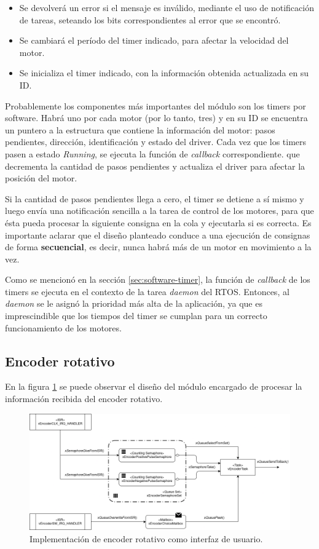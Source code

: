\documentclass{IEEEtran}
\begin{document}
\begin{itemize}
    \item Se devolverá un error si el mensaje es inválido, mediante el uso de notificación de tareas, seteando los bits correspondientes al error que se encontró.
    \item Se cambiará el período del timer indicado, para afectar la velocidad del motor.
    \item Se inicializa el timer indicado, con la información obtenida actualizada en su ID.
\end{itemize}

Probablemente los componentes más importantes del módulo son los timers por software. Habrá uno por cada motor (por lo tanto, tres) y en su ID se encuentra un puntero a la estructura que contiene la información del motor: pasos pendientes, dirección, identificación y estado del driver. Cada vez que los timers pasen a estado \textit{Running}, se ejecuta la función de \textit{callback} correspondiente. que decrementa la cantidad de pasos pendientes y actualiza el driver para afectar la posición del motor. 

Si la cantidad de pasos pendientes llega a cero, el timer se detiene a sí mismo y luego envía una notificación sencilla a la tarea de control de los motores, para que ésta pueda procesar la siguiente consigna en la cola y ejecutarla si es correcta. Es importante aclarar que el diseño planteado conduce a una ejecución de consignas de forma \textbf{secuencial}, es decir, nunca habrá más de un motor en movimiento a la vez.

Como se mencionó en la sección \ref{sec:software-timer}, la función de \textit{callback} de los timers se ejecuta en el contexto de la tarea \textit{daemon} del RTOS. Entonces, al \textit{daemon} se le asignó la prioridad más alta de la aplicación, ya que es imprescindible que los tiempos del timer se cumplan para un correcto funcionamiento de los motores.

\subsection{Encoder rotativo}
\label{sec:encoder}

En la figura \ref{fig:diagrama-encoder} se puede observar el diseño del módulo encargado de procesar la información recibida del encoder rotativo.

\begin{figure}[ht]
    \centering
    \includegraphics[scale=0.5]{../diagrama_encoder.png}
    \caption{Implementación de encoder rotativo como interfaz de usuario.}
    \label{fig:diagrama-encoder}
\end{figure}
\end{document}
